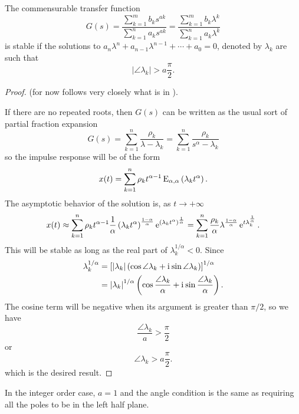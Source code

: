 \begin{theorem}
  The commensurable transfer function
  \begin{equation*}
    G(s) =  \frac{\sum_{k=1}^m b_k s^{a k}}{\sum_{k=1}^n a_k s^{a k}} = 
    \frac{\sum_{k=1}^m b_k \lambda^{k}}{\sum_{k=1}^n a_k \lambda^{k}}
  \end{equation*}
  is stable if the solutions to $a_n \lambda^n + a_{n-1} \lambda^{n-1} + \cdots + a_0 = 0$, denoted by $\lambda_k$ are such that
  \begin{equation*}
    \left| \angle \lambda_k \right| > a \frac{\pi}{2}.
  \end{equation*}
  \label{th:commensurablestability}
\end{theorem}

\begin{proof}
  (for now follows very closely what is in \cite{fraccontrol}).

  If there are no repeated roots, then $G(s)$ can be written as the usual sort of partial fraction expansion
  \begin{equation*}
    G(s) = \sum_{k=1}^n \frac{\rho_k}{\lambda - \lambda_k} =  \sum_{k=1}^n \frac{\rho_k}{s^\alpha - \lambda_k}
  \end{equation*}
  so the impulse response will be of the form
  \begin{equation*}
    x(t) = \sum_{k=1}^n \rho_k t^{\alpha-1} \operatorname{E}_{\alpha,\alpha} \left( \lambda_k t^\alpha \right).
  \end{equation*}
  The asymptotic behavior of the solution is, as $t \rightarrow +\infty$
  \begin{equation*}
    x(t) \approx \sum_{k=1}^n \rho_k t^{\alpha-1} \frac{1}{\alpha} \left( \lambda_k t^\alpha \right)^\frac{1-\alpha}{\alpha} \operatorname{e}^{\left( \lambda_k t^\alpha \right)^\frac{1}{\alpha}} = \sum_{k=1}^n \frac{\rho_k}{\alpha}\lambda^{\frac{1-\alpha}{\alpha}}\operatorname{e}^{t \lambda_k^\frac{1}{\alpha}}.
  \end{equation*}
  This will be stable as long as the real part of $\lambda_k^{1/\alpha} < 0$. Since
  \begin{align*}
    \lambda_k^{1/\alpha} &= \left[ \left| \lambda_k \right| \left( \cos \angle \lambda_k + \mathrm{i}\mkern1mu \sin \angle \lambda_k \right) \right]^{1/\alpha} \\
    &= \left| \lambda_k \right|^{1/\alpha} \left( \cos \frac{\angle \lambda_k}{\alpha} + \mathrm{i}\mkern1mu \sin \frac{\angle \lambda_k}{\alpha} \right).
  \end{align*}
  The cosine term will be negative when its argument is greater than $\pi/2$, so we have
  \begin{equation*}
    \frac{\angle \lambda_k}{a} > \frac{\pi}{2}
  \end{equation*}
  or
  \begin{equation*}
    \angle \lambda_k > a \frac{\pi}{2}.
  \end{equation*}
  which is the desired result.
\end{proof}

\begin{remark}
  In the integer order case, $a = 1$ and the angle condition is the same as requiring all the poles to be in the left half plane.
\end{remark}


